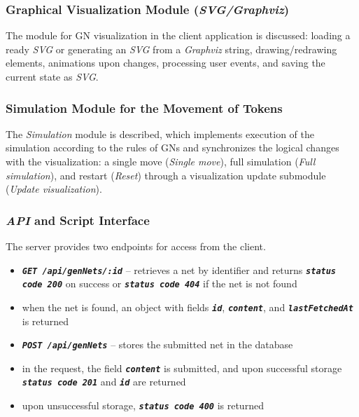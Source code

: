 	\subsubsection{Graphical Visualization Module (\textit{SVG/Graphviz})}
	\hspace*{2.5em}The module for GN visualization in the client application is discussed: loading a ready \textit{SVG} or generating an \textit{SVG} from a \textit{Graphviz} string, drawing/redrawing elements, animations upon changes, processing user events, and saving the current state as \textit{SVG}.
	
	\subsubsection{Simulation Module for the Movement of Tokens}
	\hspace*{2.5em}The \textit{Simulation} module is described, which implements execution of the simulation according to the rules of GNs and synchronizes the logical changes with the visualization: a single move (\textit{Single move}), full simulation (\textit{Full simulation}), and restart (\textit{Reset}) through a visualization update submodule (\textit{Update visualization}).
	
	\subsubsection{\textit{API} and Script Interface}\label{sec:api-script-interface}
	
	The server provides two endpoints for access from the client.
	
	\vspace{-10pt}
	\begin{itemize}
		\item \texttt{\textbf{\textit{GET /api/genNets/:id}}} -- retrieves a net by identifier and returns \texttt{\textbf{\textit{status code 200}}} on success or \texttt{\textbf{\textit{status code 404}}} if the net is not found
		\item when the net is found, an object with fields \texttt{\textbf{\textit{id}}}, \texttt{\textbf{\textit{content}}}, and \texttt{\textbf{\textit{lastFetchedAt}}} is returned
		\item \texttt{\textbf{\textit{POST /api/genNets}}} -- stores the submitted net in the database
		\item in the request, the field \texttt{\textbf{\textit{content}}} is submitted, and upon successful storage \texttt{\textbf{\textit{status code 201}}} and \texttt{\textbf{\textit{id}}} are returned
		\item upon unsuccessful storage, \texttt{\textbf{\textit{status code 400}}} is returned
	\end{itemize}
	
